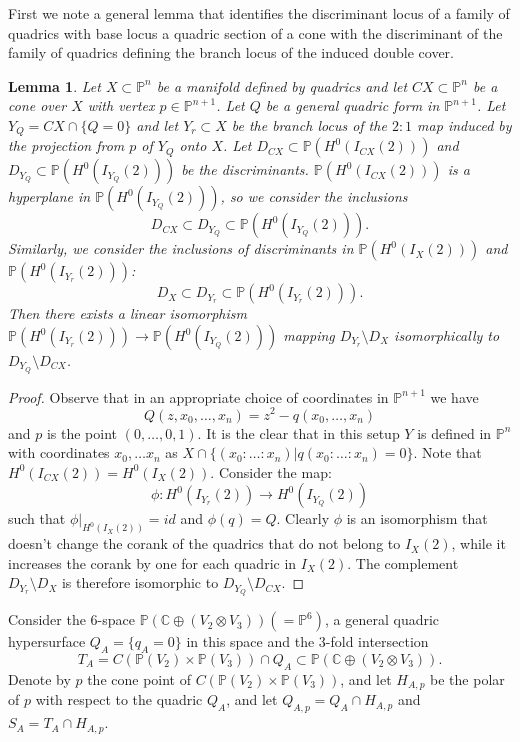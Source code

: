 \documentclass[a4paper,11pt]{amsart}
\newtheorem{lemma}[thm]{Lemma}
\theoremstyle{definition}
\numberwithin{equation}{section}
\numberwithin{equation}{section} \theoremstyle{definition}
\begin{document}
 First we note a general lemma that identifies the discriminant locus of a family of quadrics with base locus a quadric section of a cone with the discriminant of the family of quadrics defining the branch locus of the induced double cover.
\begin{lemma}\label{discr} Let $X\subset \mathbb{P}^n$ be a manifold defined by quadrics and let $CX\subset  \mathbb{P}^n$ be a cone over $X$ with vertex $p\in \mathbb{P}^{n+1}$. Let $Q$ be a general quadric form  in $\mathbb{P}^{n+1}$.  Let $Y_Q=CX\cap \{Q=0\}$ and let $Y_r\subset X$ be the branch locus of the $2:1$ map induced by the projection from $p$ of $Y_Q$ onto $X$. Let 
$D_{CX}\subset \mathbb{P}(H^0(I_{CX}(2)))$ and $D_{Y_Q}\subset \mathbb{P}(H^0(I_{Y_Q}(2)))$  be the discriminants.  $\mathbb{P}(H^0(I_{CX}(2)))$ is a hyperplane in $\mathbb{P}(H^0(I_{Y_Q}(2)))$, so we consider the inclusions
\[
D_{CX}\subset D_{Y_Q}\subset\mathbb{P}(H^0(I_{Y_Q}(2))).
\]
  Similarly, we consider the inclusions of discriminants in  $ \mathbb{P}(H^0(I_{X}(2)))$ and $\mathbb{P}(H^0(I_{Y_r}(2)))$:
  \[
  D_X\subset D_{Y_r} \subset \mathbb{P}(H^0(I_{Y_r}(2))).
  \]
 Then there exists a linear isomorphism $\mathbb{P}(H^0(I_{Y_r}(2)))\to \mathbb{P}(H^0(I_{Y_Q}(2)))$ mapping $D_{Y_r} \setminus D_X$ isomorphically to $D_{Y_Q}\setminus D_{CX}$.
\end{lemma}
\begin{proof} Observe that in an appropriate choice of coordinates in $\mathbb{P}^{n+1}$ we have $$Q(z,x_0,\dots, x_n)=z^2-q(x_0,\dots, x_n)$$ and $p$ is the point $(0,\dots, 0, 1)$. It is the clear that in this setup $Y$ is defined in $\mathbb{P}^{n}$ with coordinates $x_0,\dots x_n$ as $X\cap\{(x_0:\dots :x_n)| q(x_0: \dots :x_n)=0\}$. Note that $H^0(I_{CX}(2))=H^0(I_{X}(2))$. Consider the map: 
$$\phi: H^0(I_{Y_r}(2)) \to H^0(I_{Y_Q}(2))$$
such that $\phi |_{H^0(I_{X}(2))}=id$ and $\phi(q)=Q$. Clearly $\phi$ is an isomorphism that doesn't change the corank of the quadrics that do not belong to $I_{X}(2)$, while it increases the corank by one for each quadric in $I_{X}(2)$.  The complement $D_{Y_r} \setminus D_X$ is therefore isomorphic to $D_{Y_Q}\setminus D_{CX}$.
\end{proof}
Consider the $6$-space  ${{\mathbb{P}}}({{\mathbb{C}  }}\oplus (V_2\otimes  V_3)) (={{\mathbb{P}}}^6)$, a general quadric hypersurface $Q_A=\{q_A=0\}$ in this space and the $3$-fold intersection
 \[
 T_A=C({{\mathbb{P}}}(V_2)\times {{\mathbb{P}}}(V_3))\cap Q_A\subset {{\mathbb{P}}}({{\mathbb{C}  }}\oplus (V_2\otimes  V_3)).
 \]
 Denote by $p$ the cone point of $C({{\mathbb{P}}}(V_2)\times {{\mathbb{P}}}(V_3))$, and let $H_{A,p}$ be the polar of $p$ with respect to the quadric $Q_A$, and let $Q_{A,p}=Q_A\cap H_{A,p}$ and $S_{A}=T_A\cap H_{A,p}$.   
\end{document}
